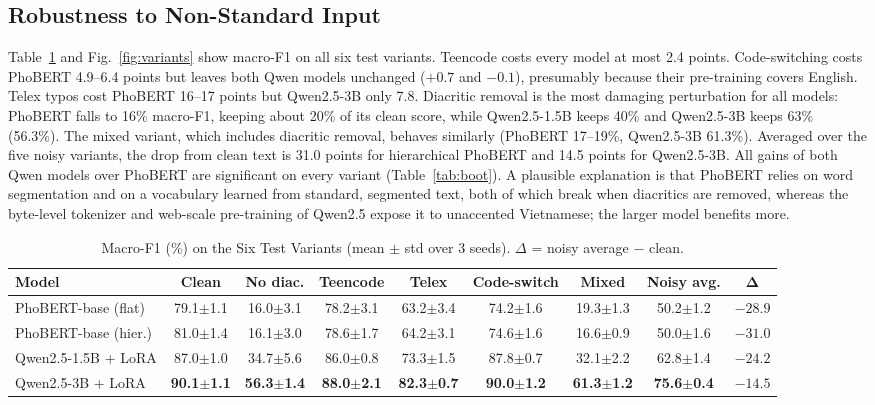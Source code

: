 \documentclass[conference]{IEEEtran}
\newcommand{\pmstd}[2]{#1{\scriptsize$\pm$#2}}
\begin{document}
\subsection{Robustness to Non-Standard Input}
Table~\ref{tab:noise} and Fig.~\ref{fig:variants} show macro-F1 on all six
test variants. Teencode costs every model at most 2.4 points.
Code-switching costs PhoBERT 4.9--6.4 points but leaves both Qwen models
unchanged ($+0.7$ and $-0.1$), presumably because their pre-training covers
English. Telex typos cost PhoBERT 16--17 points but Qwen2.5-3B only 7.8. Diacritic removal
is the most damaging perturbation for all models: PhoBERT falls to 16\%
macro-F1, keeping about 20\% of its clean score, while Qwen2.5-1.5B keeps
40\% and Qwen2.5-3B keeps 63\% (56.3\%). The mixed variant, which includes
diacritic removal, behaves similarly (PhoBERT 17--19\%, Qwen2.5-3B 61.3\%).
Averaged over the five noisy variants, the drop from clean text is 31.0
points for hierarchical PhoBERT and 14.5 points for Qwen2.5-3B. All gains of
both Qwen models over PhoBERT are significant on every variant
(Table~\ref{tab:boot}). A plausible explanation is that PhoBERT relies on
word segmentation and on a vocabulary learned from standard, segmented text,
both of which break when diacritics are removed, whereas the byte-level
tokenizer and web-scale pre-training of Qwen2.5 expose it to unaccented
Vietnamese; the larger model benefits more.

\begin{table}[t]
\caption{Macro-F1 (\%) on the Six Test Variants (mean $\pm$ std over 3 seeds). $\Delta$ = noisy average $-$ clean.}
\label{tab:noise}
\centering
\begin{tabular}{lcccccccc}
\toprule
\textbf{Model} & \textbf{Clean} & \textbf{No diac.} & \textbf{Teencode} & \textbf{Telex} & \textbf{Code-switch} & \textbf{Mixed} & \textbf{Noisy avg.} & $\boldsymbol{\Delta}$ \\
\midrule
PhoBERT-base (flat)  & \pmstd{79.1}{1.1} & \pmstd{16.0}{3.1} & \pmstd{78.2}{3.1} & \pmstd{63.2}{3.4} & \pmstd{74.2}{1.6} & \pmstd{19.3}{1.3} & \pmstd{50.2}{1.2} & $-28.9$ \\
PhoBERT-base (hier.) & \pmstd{81.0}{1.4} & \pmstd{16.1}{3.0} & \pmstd{78.6}{1.7} & \pmstd{64.2}{3.1} & \pmstd{74.6}{1.6} & \pmstd{16.6}{0.9} & \pmstd{50.0}{1.6} & $-31.0$ \\
Qwen2.5-1.5B + LoRA  & \pmstd{87.0}{1.0} & \pmstd{34.7}{5.6} & \pmstd{86.0}{0.8} & \pmstd{73.3}{1.5} & \pmstd{87.8}{0.7} & \pmstd{32.1}{2.2} & \pmstd{62.8}{1.4} & $-24.2$ \\
Qwen2.5-3B + LoRA    & \textbf{\pmstd{90.1}{1.1}} & \textbf{\pmstd{56.3}{1.4}} & \textbf{\pmstd{88.0}{2.1}} & \textbf{\pmstd{82.3}{0.7}} & \textbf{\pmstd{90.0}{1.2}} & \textbf{\pmstd{61.3}{1.2}} & \textbf{\pmstd{75.6}{0.4}} & $\mathbf{-14.5}$ \\
\bottomrule
\end{tabular}
\end{table}
\end{document}
